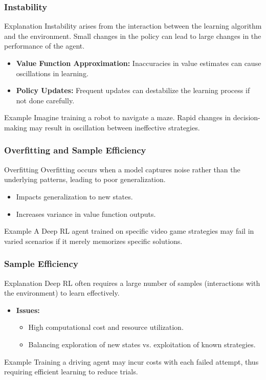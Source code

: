 \documentclass[aspectratio=169]{beamer}
\begin{document}
\begin{frame}[fragile]
  \frametitle{Instability}
  \begin{block}{Explanation}
    Instability arises from the interaction between the learning algorithm and the environment. Small changes in the policy can lead to large changes in the performance of the agent.
  \end{block}
  \begin{itemize}
    \item \textbf{Value Function Approximation:} Inaccuracies in value estimates can cause oscillations in learning.
    \item \textbf{Policy Updates:} Frequent updates can destabilize the learning process if not done carefully.
  \end{itemize}
  \begin{block}{Example}
    Imagine training a robot to navigate a maze. Rapid changes in decision-making may result in oscillation between ineffective strategies.
  \end{block}
\end{frame}

\begin{frame}[fragile]
  \frametitle{Overfitting and Sample Efficiency}
  \begin{block}{Overfitting}
    Overfitting occurs when a model captures noise rather than the underlying patterns, leading to poor generalization.
  \end{block}
  \begin{itemize}
    \item Impacts generalization to new states.
    \item Increases variance in value function outputs.
  \end{itemize}
  \begin{block}{Example}
    A Deep RL agent trained on specific video game strategies may fail in varied scenarios if it merely memorizes specific solutions.
  \end{block}
\end{frame}

\begin{frame}[fragile]
  \frametitle{Sample Efficiency}
  \begin{block}{Explanation}
    Deep RL often requires a large number of samples (interactions with the environment) to learn effectively.
  \end{block}
  \begin{itemize}
    \item \textbf{Issues:}
      \begin{itemize}
        \item High computational cost and resource utilization.
        \item Balancing exploration of new states vs. exploitation of known strategies.
      \end{itemize}
  \end{itemize}
  \begin{block}{Example}
    Training a driving agent may incur costs with each failed attempt, thus requiring efficient learning to reduce trials.
  \end{block}
\end{frame}
\end{document}
